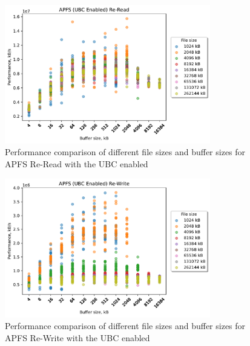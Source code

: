 \begin{figure}[!htb]
	\label{fig:bench_apfs_ubc_scatter_re-read}
	\begin{center}
		\includegraphics[width=0.8\textwidth]{figures.nosync/benchmarking/APFS/scatter-UBC Enabled-Re-Read.pdf}
	\end{center}
	\caption[Comparison of Re-Read performance for file size and buffer size for APFS with the UBC enabled]{Performance comparison of different file sizes and buffer sizes for APFS Re-Read with the UBC enabled}
\end{figure}
\begin{figure}[!htb]
	\label{fig:bench_apfs_ubc_scatter_re-write}
	\begin{center}
		\includegraphics[width=0.8\textwidth]{figures.nosync/benchmarking/APFS/scatter-UBC Enabled-Re-Write.pdf}
	\end{center}
	\caption[Comparison of Re-Write performance for file size and buffer size for APFS with the UBC enabled]{Performance comparison of different file sizes and buffer sizes for APFS Re-Write with the UBC enabled}
\end{figure}
\clearpage
